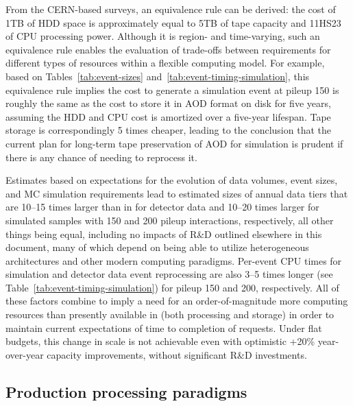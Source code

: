 From the CERN-based surveys, an equivalence rule can be derived: the cost of 1\unit{TB} of \gls{HDD} space is approximately equal to 5\unit{TB} of tape capacity and 11\unit{HS23} of \gls{CPU} processing power. Although it is region- and time-varying, such an equivalence rule enables the evaluation of trade-offs between requirements for different types of resources within a flexible computing model. For example, based on Tables~\ref{tab:event-sizes} and~\ref{tab:event-timing-simulation}, this equivalence rule implies the cost to generate a simulation event at pileup 150 is roughly the same as the cost to store it in \gls{AOD} format on disk for five years, assuming the \gls{HDD} and \gls{CPU} cost is amortized over a five-year lifespan. Tape storage is correspondingly 5 times cheaper, leading to the conclusion that the current plan for long-term tape preservation of \PhaseTwo \gls{AOD} for simulation is prudent if there is any chance of needing to reprocess it.

Estimates based on expectations for the evolution of data volumes, event sizes, and \gls{MC} simulation requirements lead to estimated sizes of annual data tiers that are 10--15 times larger than in \RunThree for detector data and 10--20 times larger for simulated samples with 150 and 200 pileup interactions, respectively, all other things being equal, including no impacts of R\&D outlined elsewhere in this document, many of which depend on being able to utilize heterogeneous architectures and other modern computing paradigms. Per-event CPU times for simulation and detector data event reprocessing are also 3--5 times longer (see Table~\ref{tab:event-timing-simulation}) for pileup 150 and 200, respectively. All of these factors combine to imply a need for an order-of-magnitude more computing resources than presently available in \RunThree (both processing and storage) in order to maintain current expectations of time to completion of requests. Under flat budgets, this change in scale is not achievable even with optimistic +20\% year-over-year capacity improvements, without significant R\&D investments.


\subsection{Production processing paradigms}
\label{sec:Infrastructure-Production}

